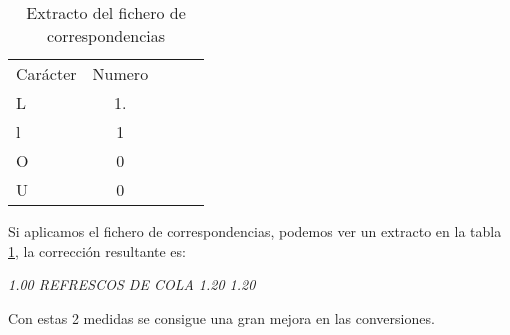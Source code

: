 \begin{table}[ht]
\center
\begin{tabular}{l c c c c}
\toprule
    Carácter    & Numero    \\
    \otoprule
	L 	&	1.\\
	l 	&	1\\
	O	&	0\\
	U	&	0\\
\bottomrule 
\end{tabular}
\label{tablaCsv}
\caption{Extracto del fichero de correspondencias}
\end{table}

Si aplicamos el fichero de correspondencias, podemos ver un extracto en la tabla \ref{tablaCsv}, la corrección resultante es:

\begin{center}
\textit{1.00 REFRESCOS DE COLA 1.20 1.20}
\end{center}
Con estas 2 medidas se consigue una gran mejora en las conversiones.

